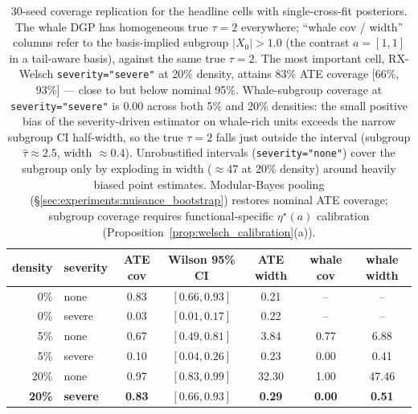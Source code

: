 \begin{table}[!t]
\centering
\small
\begin{tabular}{rlccccc}
\toprule
density & severity & ATE cov & Wilson 95\% CI & ATE width & whale cov & whale width \\
\midrule
0\%   & none   & 0.83 & $[0.66, 0.93]$ & 0.21 & -- & -- \\
0\%   & severe & 0.03 & $[0.01, 0.17]$ & 0.22 & -- & -- \\
5\%   & none   & 0.67 & $[0.49, 0.81]$ & 3.84 & 0.77 & 6.88 \\
5\%   & severe & 0.10 & $[0.04, 0.26]$ & 0.23 & 0.00 & 0.41 \\
20\%  & none   & 0.97 & $[0.83, 0.99]$ & 32.30 & 1.00 & 47.46 \\
\textbf{20\%}  & \textbf{severe} & \textbf{0.83} & $\mathbf{[0.66, 0.93]}$ & \textbf{0.29} & \textbf{0.00} & \textbf{0.51} \\
\bottomrule
\end{tabular}
\caption{30-seed coverage replication for the headline cells with
single-cross-fit posteriors. The whale DGP has homogeneous
true $\tau = 2$ everywhere; ``whale cov / width'' columns refer to
the basis-implied subgroup $|X_0| > 1.0$ (the contrast
$a = [1, 1]$ in a tail-aware basis), against the same true
$\tau = 2$. The most important cell, RX-Welsch
\texttt{severity="severe"} at 20\% density, attains 83\% ATE
coverage [66\%, 93\%] --- close to but below nominal 95\%.
Whale-subgroup coverage at \texttt{severity="severe"} is 0.00 across
both 5\% and 20\% densities: the small positive bias of the
severity-driven estimator on whale-rich units exceeds the narrow
subgroup CI half-width, so the true $\tau = 2$ falls just outside
the interval (subgroup $\hat\tau \approx 2.5$, width $\approx 0.4$).
Unrobustified intervals (\texttt{severity="none"}) cover the
subgroup only by exploding in width ($\approx 47$ at 20\% density)
around heavily biased point estimates. Modular-Bayes pooling
(\S\ref{sec:experiments:nuisance_bootstrap}) restores nominal
ATE coverage; subgroup coverage requires functional-specific
$\eta^\star(a)$ calibration (Proposition~\ref{prop:welsch_calibration}(a)).}
\label{tab:coverage_30seed}
\end{table}

